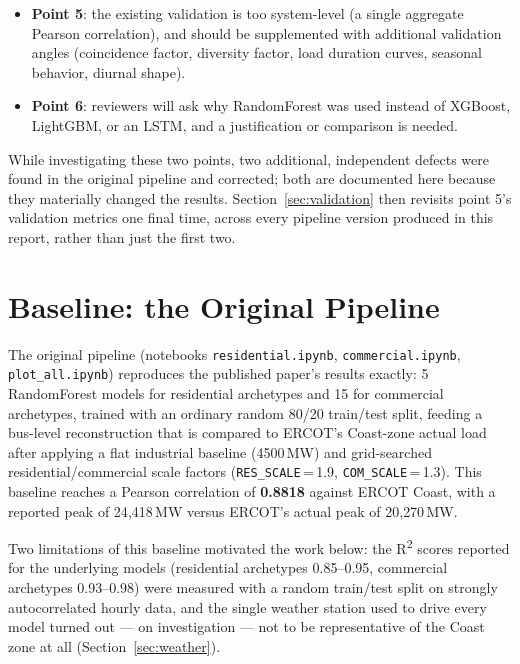 \documentclass[11pt]{article}
\begin{document}
\begin{itemize}
    \item \textbf{Point 5}: the existing validation is too system-level (a single
    aggregate Pearson correlation), and should be supplemented with additional
    validation angles (coincidence factor, diversity factor, load duration curves,
    seasonal behavior, diurnal shape).
    \item \textbf{Point 6}: reviewers will ask why RandomForest was used instead of
    XGBoost, LightGBM, or an LSTM, and a justification or comparison is needed.
\end{itemize}

While investigating these two points, two additional, independent defects were found
in the original pipeline and corrected; both are documented here because they
materially changed the results. Section~\ref{sec:validation} then revisits point 5's
validation metrics one final time, across every pipeline version produced in this
report, rather than just the first two.

\section{Baseline: the Original Pipeline}
\label{sec:baseline}

The original pipeline (notebooks \texttt{residential.ipynb}, \texttt{commercial.ipynb},
\texttt{plot\_all.ipynb}) reproduces the published paper's results exactly: 5
RandomForest models for residential archetypes and 15 for commercial archetypes,
trained with an ordinary random 80/20 train/test split, feeding a bus-level
reconstruction that is compared to ERCOT's Coast-zone actual load after applying a
flat industrial baseline (4500\,MW) and grid-searched residential/commercial scale
factors (\texttt{RES\_SCALE}\,=\,1.9, \texttt{COM\_SCALE}\,=\,1.3). This baseline
reaches a Pearson correlation of \textbf{0.8818} against ERCOT Coast, with a reported
peak of 24{,}418\,MW versus ERCOT's actual peak of 20{,}270\,MW.

Two limitations of this baseline motivated the work below: the R\textsuperscript{2}
scores reported for the underlying models (residential archetypes 0.85--0.95,
commercial archetypes 0.93--0.98) were measured with a random train/test split on
strongly autocorrelated hourly data, and the single weather station used to drive
every model turned out --- on investigation --- not to be representative of the Coast
zone at all (Section~\ref{sec:weather}).
\end{document}
